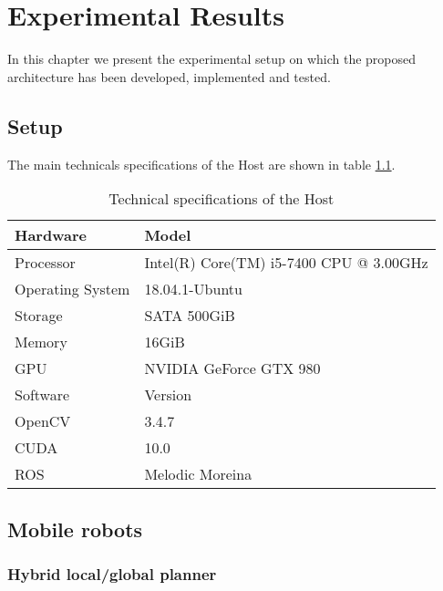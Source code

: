 \chapter{Experimental Results} \label{chap:experimental-results}


In this chapter we present the experimental setup on which the proposed architecture has been developed, implemented and tested.

\section{Setup}
The main technicals specifications of the Host are shown in table \ref{tab:tech-specs-host}.


\begin{table}[ht!]
	\centering
	\begin{tabular}{|l|l|}
		\hline
		\rowcolor{Gray}
		Hardware 			& Model 												\\
		\hline
		Processor 			& Intel(R) Core(TM) i5-7400 CPU @ 3.00GHz				\\
		Operating System 	& 18.04.1-Ubuntu										\\
		Storage 			& SATA 500GiB											\\
		Memory				& 16GiB													\\
		GPU					& NVIDIA GeForce GTX 980								\\
		\hline
		\rowcolor{Gray}
		Software 			& Version 												\\
		\hline
		OpenCV				& 3.4.7													\\
		CUDA				& 10.0													\\
		ROS					& Melodic Moreina										\\
		\hline
	\end{tabular}
	\caption{Technical specifications of the Host \label{tab:tech-specs-host}}
\end{table}

\section{Mobile robots}




\subsection{Hybrid local/global planner}



